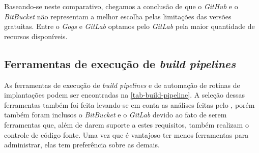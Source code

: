 \documentclass[
	12pt,				%
	openright,			%
	oneside,			%
	a4paper,			%
	english,			%
	french,				%
	spanish,			%
	brazil,				%
	]{abntex2}
\begin{document}
Baseando-se neste comparativo, chegamos a conclusão de que o \textit{GitHub} e o \textit{BitBucket} não representam a melhor escolha pelas limitações das versões gratuitas. Entre o \textit{Gogs} e \textit{GitLab} optamos pelo \textit{GitLab} pela maior quantidade de recursos disponíveis.

\subsection{Ferramentas de execução de \textit{build pipelines}}

As ferramentas de execução de \textit{build pipelines} e de automação de rotinas de implantações podem ser encontradas na \autoref{tab-build-pipeline}. A seleção dessas ferramentas também foi feita levando-se em conta as análises feitas pelo , porém também foram inclusos o \textit{BitBucket} e o \textit{GitLab} devido ao fato de serem ferramentas que, além de darem suporte a estes requisitos, também realizam o controle de código fonte. Uma vez que é vantajoso ter menos ferramentas para administrar, elas tem preferência sobre as demais.
\end{document}
